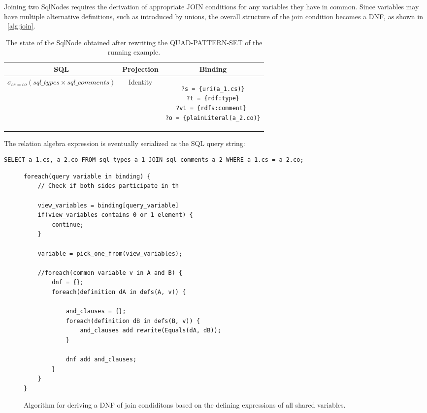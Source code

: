 \documentclass[a4paper,twoside,bibtotoc,abstracton,12pt,BCOR=15mm]{scrreprt}
\begin{document}
Joining two SqlNodes requires the derivation of appropriate JOIN conditions for any variables they have in common.
Since variables may have multiple alternative definitions, such as introduced by unions, the overall structure of
the join condition becomes a DNF, as shown in ~\autoref{alg:join}.


\begin{table}
\begin{tabular}{ccc}
\toprule
SQL & Projection & Binding \\
\midrule

$\sigma_{cs = co} \left ( sql\_types \times sql\_comments \right )$

&

Identity

&

\begin{minipage}{5cm}
\begin{scriptsize}
\begin{verbatim}
?s = {uri(a_1.cs)}
?t = {rdf:type}
?v1 = {rdfs:comment} 
?o = {plainLiteral(a_2.co)}
\end{verbatim} 
\end{scriptsize}
\end{minipage}

\\
\bottomrule
\end{tabular}
\caption{The state of the SqlNode obtained after rewriting the QUAD-PATTERN-SET of the running example.}
\end{table}

The relation algebra expression is eventually serialized as the SQL query string:
\begin{lstlisting}
SELECT a_1.cs, a_2.co FROM sql_types a_1 JOIN sql_comments a_2 WHERE a_1.cs = a_2.co;
\end{lstlisting}



\begin{figure}
\begin{lstlisting} 
foreach(query variable in binding) {
    // Check if both sides participate in th

    view_variables = binding[query_variable]
    if(view_variables contains 0 or 1 element) { 
        continue;
    }
    
    variable = pick_one_from(view_variables);
     
	//foreach(common variable v in A and B) {
		dnf = {};
	    foreach(definition dA in defs(A, v)) {
	    
	    	and_clauses = {};
	    	foreach(definition dB in defs(B, v)) {
	    		and_clauses add rewrite(Equals(dA, dB));
	    	}
	    	
	    	dnf add and_clauses;
	    }
	}
}
\end{lstlisting}
\caption{Algorithm for deriving a DNF of join condiditons based on the defining expressions of all shared variables.}
\label{alg:join}
\end{figure}
\end{document}

